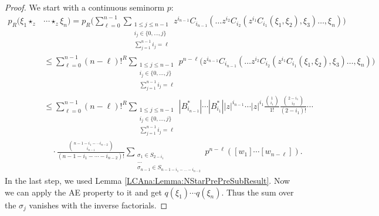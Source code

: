 \begin{proof}
    We start with a continuous seminorm $p$:
    \begin{align}
        \nonumber
        p_R \big(
            \xi_1 \star_z 
        &
            \cdots \star_z \xi_n
        \big)
        =
        p_R \Bigg(
        \sum\limits_{\ell = 0}^{n-1}
        \sum\limits_{\substack{
			1 \leq j \leq n-1 \\
			i_j \in \{0, \ldots, j\} \\
			\sum_{j = 1}^{n - 1} i_j = \ell
		}}
		z^{i_{n-1}}
		C_{i_{n-1}}
		\left(
			\ldots z^{i_2} C_{i_2}
			\left(
				z^{i_1} C_{i_1}
				\left( \xi_1, \xi_2 \right)
				, \xi_3
			\right)
			\ldots, \xi_n
		\right)
        \Bigg)
        \\
        \nonumber
        & \leq
        \sum\limits_{\ell = 0}^{n-1}
        (n - \ell)!^R
        \sum\limits_{\substack{
			1 \leq j \leq n-1 \\
			i_j \in \{0, \ldots, j\} \\
			\sum_{j = 1}^{n - 1} i_j = \ell
		}}
        p^{n - \ell} \Big(
		z^{i_{n-1}}
		C_{i_{n-1}}
		\left(
			\ldots z^{i_2} C_{i_2}
			\left(
				z^{i_1} C_{i_1}
				\left( \xi_1, \xi_2 \right)
				, \xi_3
			\right)
			\ldots, \xi_n
		\right)
		\Big)
        \\
        \nonumber
        & \leq
        \sum\limits_{\ell = 0}^{n-1}
        (n - \ell)!^R
        \sum\limits_{\substack{
			1 \leq j \leq n-1 \\
			i_j \in \{0, \ldots, j\} \\
			\sum_{j = 1}^{n - 1} i_j = \ell
		}}
        |B_{i_{n-1}}^*| \cdots |B_{i_1}^*|
        |z|^{i_{n-1}} \cdots |z|^{i_1}
        \frac{\binom{1}{i_1}}{1!}
        \frac{\binom{2 - i_1}{i_2}}{(2-i_1)!}
        \cdots
        \\
        \label{LCAna:PreContinuityIntermediateN}
        & \quad \cdot
        \frac{\binom{n - 1 - i_1 - \cdots i_{n-2}}{i_{n-1}}}
        {(n - 1 - i_1 - \cdots - i_{n-2})!}
		\sum\limits_{\substack{
			\sigma_1 \in S_{2 - i_1} \\
			\ldots\\
			\sigma_{n-1} \in S_{n-1 - i_1 - \ldots - i_{n-2}}			
		}}       
        p^{n - \ell}
        \left( 
         	[w_1] \cdots [w_{n - \ell}]
        	\right).
    \end{align}
    In the last step, we used Lemma \ref{LCAna:Lemma:NStarPrePreSubResult}. Now
    we can apply the AE property to it and get $q(\xi_1) \cdots q(\xi_n)$. Thus 
    the sum over the $\sigma_j$ vanishes with the inverse factorials.

\end{proof}
